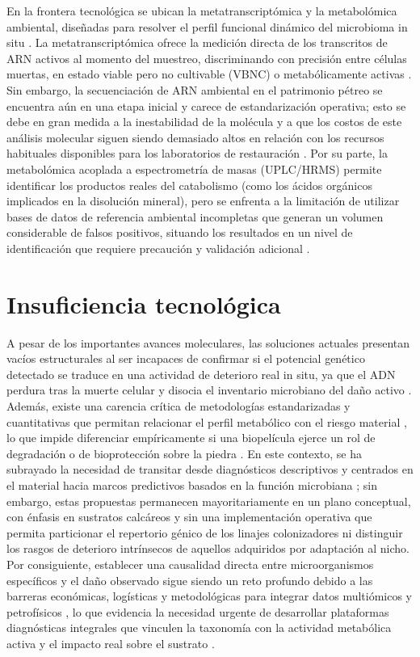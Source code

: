 En la frontera tecnológica se ubican la metatranscriptómica y la metabolómica ambiental, diseñadas para resolver el perfil funcional dinámico del microbioma in situ \cite{cappitelli2020, gutarowska2015}. La metatranscriptómica ofrece la medición directa de los transcritos de ARN activos al momento del muestreo, discriminando con precisión entre células muertas, en estado viable pero no cultivable (VBNC) o metabólicamente activas \cite{branysova2022}. Sin embargo, la secuenciación de ARN ambiental en el patrimonio pétreo se encuentra aún en una etapa inicial y carece de estandarización operativa; esto se debe en gran medida a la inestabilidad de la molécula y a que los costos de este análisis molecular siguen siendo demasiado altos en relación con los recursos habituales disponibles para los laboratorios de restauración \cite{suchy2024, sterflinger2013}. Por su parte, la metabolómica acoplada a espectrometría de masas (UPLC/HRMS) permite identificar los productos reales del catabolismo (como los ácidos orgánicos implicados en la disolución mineral), pero se enfrenta a la limitación de utilizar bases de datos de referencia ambiental incompletas que generan un volumen considerable de falsos positivos, situando los resultados en un nivel de identificación que requiere precaución y validación adicional \cite{gutarowska2015}.

\section{Insuficiencia tecnológica}
\label{sec:insuficiencia_tecnologica}

A pesar de los importantes avances moleculares, las soluciones actuales presentan vacíos estructurales al ser incapaces de confirmar si el potencial genético detectado se traduce en una actividad de deterioro real in situ, ya que el ADN perdura tras la muerte celular y disocia el inventario microbiano del daño activo \cite{ding2020preahvihear, cappitelli2020, branysova2022}. Además, existe una carencia crítica de metodologías estandarizadas y cuantitativas que permitan relacionar el perfil metabólico con el riesgo material \cite{cappitelli2020}, lo que impide diferenciar empíricamente si una biopelícula ejerce un rol de degradación o de bioprotección sobre la piedra \cite{cappitelli2020}. En este contexto, se ha subrayado la necesidad de transitar desde diagnósticos descriptivos y centrados en el material hacia marcos predictivos basados en la función microbiana \cite{gallego2025}; sin embargo, estas propuestas permanecen mayoritariamente en un plano conceptual, con énfasis en sustratos calcáreos y sin una implementación operativa que permita particionar el repertorio génico de los linajes colonizadores ni distinguir los rasgos de deterioro intrínsecos de aquellos adquiridos por adaptación al nicho. Por consiguiente, establecer una causalidad directa entre microorganismos específicos y el daño observado sigue siendo un reto profundo debido a las barreras económicas, logísticas y metodológicas para integrar datos multiómicos y petrofísicos \citep{branysova2022, gutarowska2015}, lo que evidencia la necesidad urgente de desarrollar plataformas diagnósticas integrales que vinculen la taxonomía con la actividad metabólica activa y el impacto real sobre el sustrato \cite{cappitelli2020}.